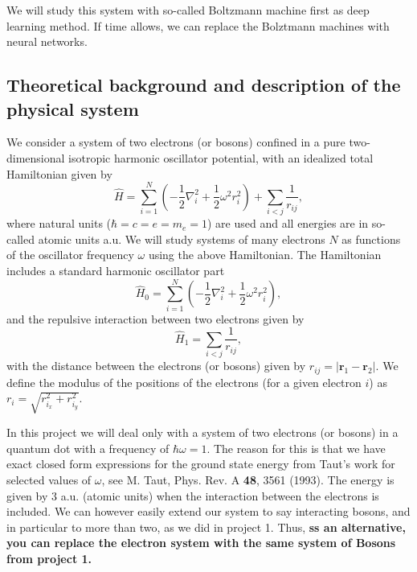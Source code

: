 \documentclass[%
oneside,                 %
final,                   %
10pt]{article}
\begin{document}
We will study this system with so-called Boltzmann machine first as deep learning method. If time allows, we can replace the Bolztmann machines with neural networks.

\subsection{Theoretical background and description of the physical system}

We consider a system of two electrons (or bosons) confined in a pure two-dimensional 
isotropic harmonic oscillator potential, with an idealized  total Hamiltonian given by
\begin{equation}
\label{eq:finalH}
\hat{H}=\sum_{i=1}^{N} \left(  -\frac{1}{2} \nabla_i^2 + \frac{1}{2} \omega^2r_i^2  \right)+\sum_{i<j}\frac{1}{r_{ij}},
\end{equation}
where natural units ($\hbar=c=e=m_e=1$) are used and all energies are in so-called atomic units a.u. We will study systems of many electrons $N$ as functions of the oscillator frequency  $\omega$ using the above Hamiltonian.  The Hamiltonian includes a standard harmonic oscillator part
\begin{equation*}
\hat{H}_0=\sum_{i=1}^{N} \left(  -\frac{1}{2} \nabla_i^2 + \frac{1}{2} \omega^2r_i^2  \right),
\end{equation*}
and the repulsive interaction between two electrons given by
\begin{equation*}
\hat{H}_1=\sum_{i<j}\frac{1}{r_{ij}},
\end{equation*}
with the distance between the electrons (or bosons)  given by $r_{ij}=\vert \bm{r}_1-\bm{r}_2\vert$. We define the 
modulus of the positions of the electrons (for a given electron $i$) as $r_i = \sqrt{r_{i_x}^2+r_{i_y}^2}$.

In this project  we will deal only with a system of
two electrons (or bosons) in a quantum dot with a frequency of $\hbar\omega = 1$. 
The reason for this is that we have exact closed form expressions 
for the ground state energy from Taut's work for selected values of $\omega$, 
see M. Taut, Phys. Rev. A \textbf{48}, 3561 (1993).
The energy is given by $3$ a.u.  (atomic units) when the interaction between the electrons is included. We can however easily extend our system to say interacting bosons, and in particular to more than two,  as we did in project 1.
Thus, \textbf{ss an alternative, you can replace the electron system with the same system of Bosons from project 1.}
\end{document}
